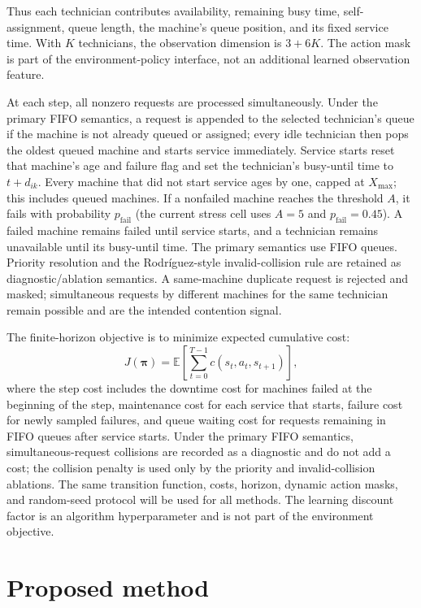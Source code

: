 \documentclass[11pt]{article}
\begin{document}
Thus each technician contributes availability, remaining busy time, self-assignment, queue length, the machine's queue position, and its fixed service time. With $K$ technicians, the observation dimension is $3+6K$. The action mask is part of the environment-policy interface, not an additional learned observation feature.

At each step, all nonzero requests are processed simultaneously. Under the primary FIFO semantics, a request is appended to the selected technician's queue if the machine is not already queued or assigned; every idle technician then pops the oldest queued machine and starts service immediately. Service starts reset that machine's age and failure flag and set the technician's busy-until time to $t+d_{ik}$. Every machine that did not start service ages by one, capped at $X_{\max}$; this includes queued machines. If a nonfailed machine reaches the threshold $A$, it fails with probability $p_{\mathrm{fail}}$ (the current stress cell uses $A=5$ and $p_{\mathrm{fail}}=0.45$). A failed machine remains failed until service starts, and a technician remains unavailable until its busy-until time. The primary semantics use FIFO queues. Priority resolution and the Rodríguez-style invalid-collision rule are retained as diagnostic/ablation semantics. A same-machine duplicate request is rejected and masked; simultaneous requests by different machines for the same technician remain possible and are the intended contention signal.

The finite-horizon objective is to minimize expected cumulative cost:
\begin{equation}
    J(\boldsymbol{\pi}) = \mathbb{E}\left[\sum_{t=0}^{T-1} c(s_t,a_t,s_{t+1})\right],
\end{equation}
where the step cost includes the downtime cost for machines failed at the beginning of the step, maintenance cost for each service that starts, failure cost for newly sampled failures, and queue waiting cost for requests remaining in FIFO queues after service starts. Under the primary FIFO semantics, simultaneous-request collisions are recorded as a diagnostic and do not add a cost; the collision penalty is used only by the priority and invalid-collision ablations. The same transition function, costs, horizon, dynamic action masks, and random-seed protocol will be used for all methods. The learning discount factor is an algorithm hyperparameter and is not part of the environment objective.

\section{Proposed method}
\end{document}
